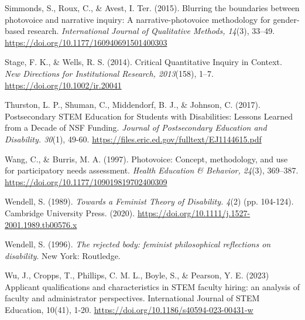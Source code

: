 \documentclass{sig-alternate} %
\begin{document}
Simmonds, S., Roux, C., \& Avest, I. Ter. (2015). Blurring the boundaries between photovoice and narrative inquiry: A narrative-photovoice methodology for gender-based research. \textit{International Journal of Qualitative Methods, 14}(3), 33–49. \url{https://doi.org/10.1177/160940691501400303}

Stage, F. K., \& Wells, R. S. (2014). Critical Quantitative Inquiry in Context. \textit{New Directions for Institutional Research, 2013}(158), 1–7. \url{https://doi.org/10.1002/ir.20041}

Thurston, L. P., Shuman, C., Middendorf, B. J., \& Johnson, C. (2017). Postsecondary STEM Education for Students with Disabilities: Lessons Learned from a Decade of NSF Funding. \textit{Journal of Postsecondary Education and Disability. 30}(1), 49-60. \url{https://files.eric.ed.gov/fulltext/EJ1144615.pdf}

Wang, C., \& Burris, M. A. (1997). Photovoice: Concept, methodology, and use for participatory needs assessment. \textit{Health Education \& Behavior, 24}(3), 369–387. \url{https://doi.org/10.1177/109019819702400309}

Wendell, S. (1989). \textit{Towards a Feminist Theory of Disability. 4}(2) (pp. 104-124). Cambridge University Press. (2020). \url{https://doi.org/10.1111/j.1527-2001.1989.tb00576.x}

Wendell, S. (1996). \textit{The rejected body: feminist philosophical reflections on disability}. New York: Routledge. 

Wu, J., Cropps, T., Phillips, C. M. L., Boyle, S., \& Pearson, Y. E. (2023) Applicant qualifications and characteristics in STEM faculty hiring: an analysis of faculty and administrator perspectives. International Journal of STEM Education, 10(41), 1-20. \url{https://doi.org/10.1186/s40594-023-00431-w}
\end{document}
